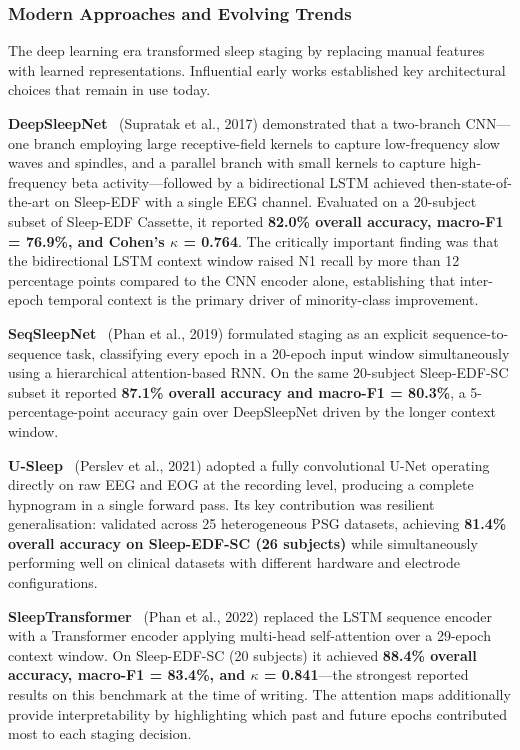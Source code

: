 \documentclass[10pt]{article}
\begin{document}
\subsubsection{Modern Approaches and Evolving Trends}
\label{sec:modern}

The deep learning era transformed sleep staging by replacing manual features with learned representations. Influential early works established key architectural choices that remain in use today.

\textbf{DeepSleepNet}~\cite{supratak2017deepsleepnet} (Supratak et al., 2017) demonstrated that a two-branch CNN---one branch employing large receptive-field kernels to capture low-frequency slow waves and spindles, and a parallel branch with small kernels to capture high-frequency beta activity---followed by a bidirectional LSTM achieved then-state-of-the-art on Sleep-EDF with a single EEG channel. Evaluated on a 20-subject subset of Sleep-EDF Cassette, it reported \textbf{82.0\% overall accuracy, macro-F1 = 76.9\%, and Cohen's $\kappa$ = 0.764}. The critically important finding was that the bidirectional LSTM context window raised N1 recall by more than 12 percentage points compared to the CNN encoder alone, establishing that inter-epoch temporal context is the primary driver of minority-class improvement.

\textbf{SeqSleepNet}~\cite{phan2019seqsleepnet} (Phan et al., 2019) formulated staging as an explicit sequence-to-sequence task, classifying every epoch in a 20-epoch input window simultaneously using a hierarchical attention-based RNN. On the same 20-subject Sleep-EDF-SC subset it reported \textbf{87.1\% overall accuracy and macro-F1 = 80.3\%}, a 5-percentage-point accuracy gain over DeepSleepNet driven by the longer context window.

\textbf{U-Sleep}~\cite{perslev2021usleep} (Perslev et al., 2021) adopted a fully convolutional U-Net operating directly on raw EEG and EOG at the recording level, producing a complete hypnogram in a single forward pass. Its key contribution was resilient generalisation: validated across 25 heterogeneous PSG datasets, achieving \textbf{81.4\% overall accuracy on Sleep-EDF-SC (26 subjects)} while simultaneously performing well on clinical datasets with different hardware and electrode configurations.

\textbf{SleepTransformer}~\cite{phan2022sleeptransformer} (Phan et al., 2022) replaced the LSTM sequence encoder with a Transformer encoder applying multi-head self-attention over a 29-epoch context window. On Sleep-EDF-SC (20 subjects) it achieved \textbf{88.4\% overall accuracy, macro-F1 = 83.4\%, and $\kappa$ = 0.841}---the strongest reported results on this benchmark at the time of writing. The attention maps additionally provide interpretability by highlighting which past and future epochs contributed most to each staging decision.
\end{document}
